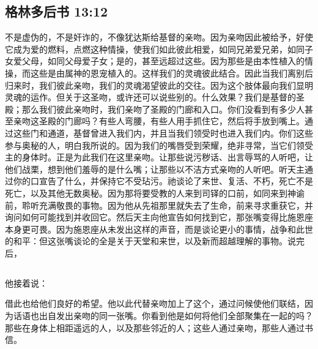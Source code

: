 \subsection{格林多后书 13:12}

\par

不是虚伪的，不是奸诈的，不像犹达斯给基督的亲吻。因为亲吻因此被给予，好使它成为爱的燃料，点燃这种情操，使我们如此彼此相爱，如同兄弟爱兄弟，如同子女爱父母，如同父母爱子女；是的，甚至远超过这些。因为那些是由本性植入的情操，而这些是由属神的恩宠植入的。这样我们的灵魂彼此结合。因此当我们离别后归来时，我们彼此亲吻，我们的灵魂渴望彼此的交往。因为这个肢体最向我们显明灵魂的运作。但关于这圣吻，或许还可以说些别的。什么效果？我们是基督的圣殿；那么我们彼此亲吻时，我们亲吻了圣殿的门廊和入口。你们没看到有多少人甚至亲吻这圣殿的门廊吗？有些人弯腰，有些人用手抓住它，然后将手放到嘴上。通过这些门和通道，基督曾进入我们内，并且当我们领受时也进入我们内。你们这些参与奥秘的人，明白我所说的。因为我们的嘴唇受到荣耀，绝非寻常，当它们领受主的身体时。正是为此我们在这里亲吻。让那些说污秽话、出言辱骂的人听吧，让他们战栗，想到他们羞辱的是什么嘴；让那些以不洁方式亲吻的人听吧。听天主通过你的口宣告了什么，并保持它不受玷污。祂谈论了来世、复活、不朽，死亡不是死亡，以及其他无数奥秘。因为那将要受教的人来到司铎的口前，如同来到神谕前，聆听充满敬畏的事物。因为他从先祖那里就失去了生命，前来寻求重获它，并询问如何可能找到并收回它。然后天主向他宣告如何找到它，那张嘴变得比施恩座本身更可畏。因为施恩座从未发出这样的声音，而是谈论更小的事情，战争和此世的和平：但这张嘴谈论的全是关于天堂和来世，以及新而超越理解的事物。说完后，\par


\subsection{}

他接着说：\par

借此也给他们良好的希望。他以此代替亲吻加上了这个，通过问候使他们联结，因为话语也出自发出亲吻的同一张嘴。你看到他是如何将他们全部聚集在一起的吗？那些在身体上相距遥远的人，以及那些邻近的人；这些人通过亲吻，那些人通过书信。\par


